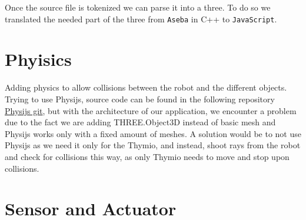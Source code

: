 \documentclass{scrbook}
\begin{document}
Once the source file is tokenized we can parse it into a three. To do so we translated the needed part of the three from \texttt{Aseba} in C++ to \texttt{JavaScript}.


\section{Phyisics}

Adding physics to allow collisions between the robot and the different objects. Trying to use Physijs, source code can be found in the following repository \href{https://github.com/chandlerprall/Physijs/wiki/Basic-Setup}{Physijs git}, 
but with the architecture of our application, we encounter a problem due to the fact we are adding THREE.Object3D instead of basic mesh and Physijs works only with a fixed amount of meshes. A solution would be to not use Physijs as we need it only for the Thymio,
and instead, shoot rays from the robot and check for collisions this way, as only Thymio needs to move and stop upon collisions.

\section{Sensor and Actuator}
\end{document}
